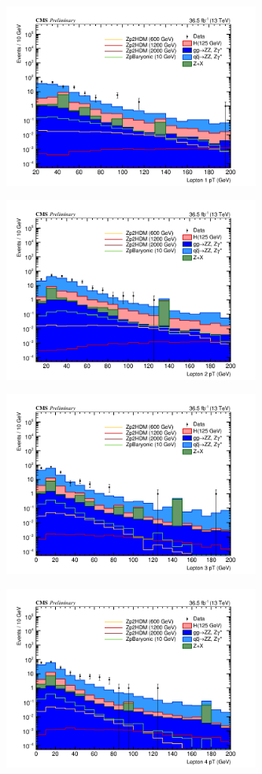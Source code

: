 \begin{figure}[tbh]
\begin{subfigure}{0.50\textwidth}
\centering
\includegraphics[width=3.3in]{figures/hist_hlept1_pt_CR.png}
\caption{}
\end{subfigure}
\begin{subfigure}{0.50\textwidth}
\centering
\includegraphics[width=3.3in]{figures/hist_hlept2_pt_CR.png}
\caption{}
\end{subfigure}
\begin{subfigure}{0.50\textwidth}
\centering
\includegraphics[width=3.3in]{figures/hist_hlept3_pt_CR.png}
\caption{}
\end{subfigure}
\begin{subfigure}{0.50\textwidth}
\centering
\includegraphics[width=3.3in]{figures/hist_hlept4_pt_CR.png}

\end{subfigure}
\end{figure}

